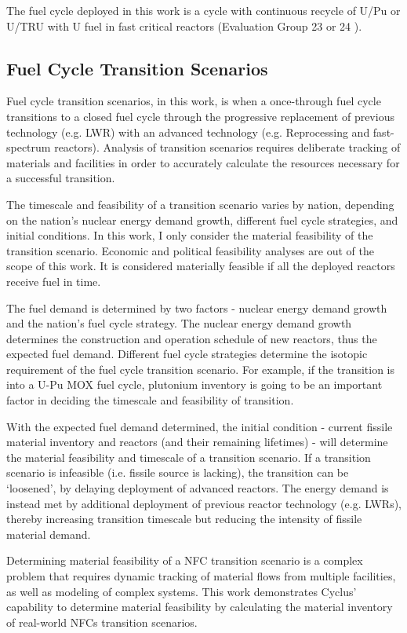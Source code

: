 The fuel cycle deployed in this work is a cycle with
continuous recycle of U/Pu or U/TRU with U fuel in fast critical reactors
(Evaluation Group 23 or 24 \cite{wigeland_nuclear_2014}).

\subsection{Fuel Cycle Transition Scenarios}
Fuel cycle transition scenarios, in this work, is when
a once-through fuel cycle transitions to a closed fuel
cycle through the progressive replacement of previous technology
(e.g. \gls{LWR}) with an advanced technology (e.g. Reprocessing
and fast-spectrum reactors). Analysis of transition scenarios requires
deliberate tracking of materials and facilities in order
to accurately calculate the resources necessary for a
successful transition. 

The timescale and feasibility of a transition scenario
varies by nation, depending on the nation's nuclear energy demand
growth, different fuel cycle strategies, and initial conditions.
In this work, I only consider the material feasibility of the
transition scenario. Economic and political feasibility analyses
are out of the scope of this work. It is considered
materially feasible if all the deployed reactors receive fuel
in time. 

The fuel demand is determined by two factors - nuclear energy demand
growth and the nation's fuel cycle strategy.
The nuclear energy demand growth determines the construction
and operation
schedule of new reactors, thus the expected fuel demand.
Different fuel cycle strategies determine the isotopic
requirement of the fuel cycle transition scenario. For example,
if the transition is into a U-Pu \gls{MOX} fuel cycle,
plutonium inventory is going to be an important factor
in deciding the timescale and feasibility of transition.

With the expected fuel demand determined,
the initial condition - current fissile material inventory
and reactors (and their remaining lifetimes) - will determine
the material feasibility and timescale of a transition scenario.
If a transition scenario is infeasible (i.e. fissile source is lacking),
the transition can be `loosened', by delaying deployment
of advanced reactors. The energy demand is instead met by additional
deployment of previous reactor technology (e.g. \glspl{LWR}),
thereby increasing transition timescale but reducing the
intensity of fissile material demand. 

Determining material feasibility of a \gls{NFC} transition scenario
is a complex problem that requires
dynamic tracking of material flows from multiple facilities,
as well as modeling of complex systems. This work demonstrates
Cyclus' capability to determine material feasibility by calculating
the material inventory of real-world \glspl{NFC} transition scenarios.


